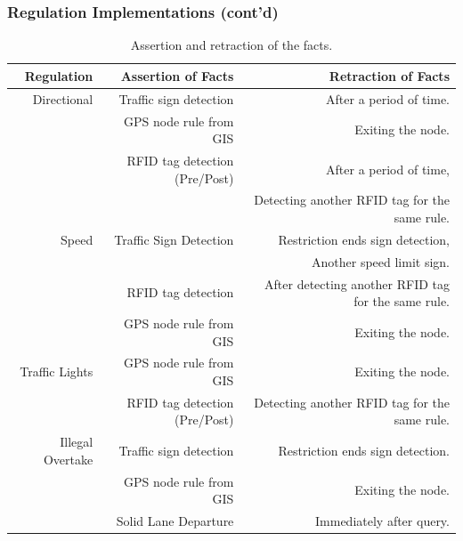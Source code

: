\documentclass{beamer}
\begin{document}
\frame
{
  \frametitle{Regulation Implementations (cont'd)}
	\begin{table}[!ht]
	\caption{Assertion and retraction of the facts.}
	\label{assert}
	{\tiny
	\begin{tabular}{|r|r|r|}
	\hline
	{\bf Regulation} & {\bf Assertion of Facts} & {\bf Retraction of Facts} \\
	\hline
	Directional & Traffic sign detection & After a period of time. \\
	\cline{2-3}
	           & GPS node rule from GIS & Exiting the node. \\
	\cline{2-3}
	           & RFID tag detection (Pre/Post) & After a period of time, \\
	\cline{3-3}
	           &            & Detecting another RFID tag for the same rule. \\
	\hline
	     Speed & Traffic Sign Detection & Restriction ends sign detection, \\
	\cline{3-3}
	           &            & Another speed limit sign. \\
	\cline{2-3}
	           & RFID tag detection & After detecting another RFID tag for the same rule. \\
	\cline{2-3}
	           & GPS node rule from GIS & Exiting the node. \\
	\hline
	Traffic Lights & GPS node rule from GIS & Exiting the node. \\
	\cline{2-3}
	           & RFID tag detection (Pre/Post) & Detecting another RFID tag for the same rule. \\
	\hline
	Illegal Overtake & Traffic sign detection & Restriction ends sign detection. \\
	\cline{2-3}
	           & GPS node rule from GIS & Exiting the node. \\
	\cline{2-3}
	           & Solid Lane Departure & Immediately after query. \\
	\hline
	
	\end{tabular}  
	}
	\end{table}
}
\end{document}
